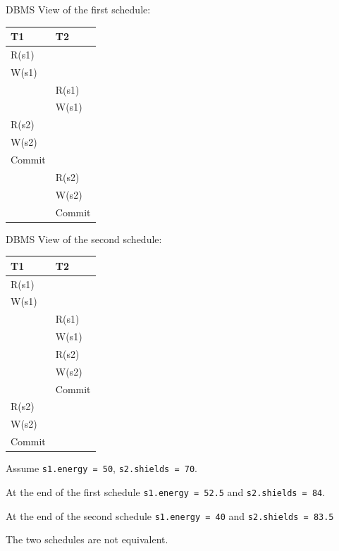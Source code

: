 \documentclass{beamer}
\begin{document}
\begin{slide}{
		\item DBMS View of the first schedule:
		\begin{table}
			\tiny
			\begin{tabular}{l|l}
				T1 & T2\\
				\hline
				R(s1) & \\
				W(s1) & \\
				& R(s1) \\
				& W(s1) \\
				R(s2) & \\
				W(s2) & \\
				Commit & \\
				& R(s2) \\
				& W(s2) \\
				& Commit\\		
			\end{tabular}
\pause
		\end{table}
		\item DBMS View of the second schedule:
		\begin{table}
			\tiny
			\begin{tabular}{l|l}
				T1 & T2\\
				\hline
				R(s1) & \\
				W(s1) & \\
				 & R(s1) \\
				 & W(s1) \\
				 & R(s2) \\
				 & W(s2) \\
				 & Commit \\
				 R(s2) \\
				 W(s2) \\
				 Commit \\		
			\end{tabular}
		\end{table}
}\end{slide}

\begin{slide}{
	\item Assume \texttt{s1.energy = 50}, \texttt{s2.shields = 70}.
	\item At the end of the first schedule \texttt{s1.energy = 52.5} and \texttt{s2.shields = 84}.
\pause
	\item At the end of the second schedule \texttt{s1.energy = 40} and \texttt{s2.shields = 83.5}
	\item The two schedules are not equivalent.
}\end{slide}
\end{document}

